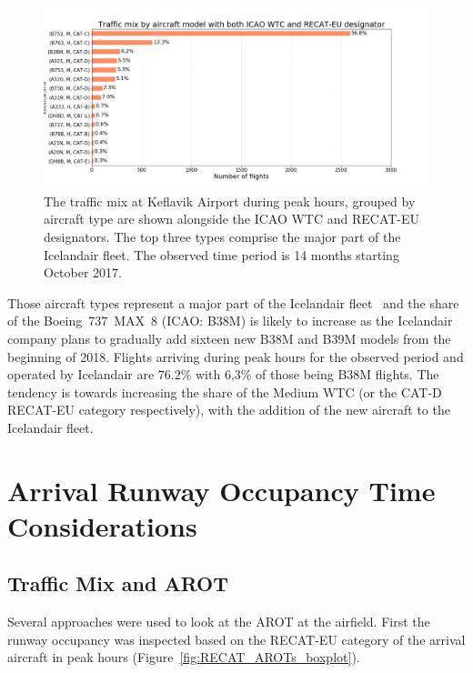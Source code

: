 \begin{figure}[h]
    \centering
    \includegraphics[width=1\textwidth]{graphics/fig_traffic_mix_by_model.png}
    \caption[Traffic mix by aircraft type.]{The traffic mix at Keflavik Airport during peak hours, grouped by aircraft type are shown alongside the ICAO WTC and RECAT-EU designators. The top three types comprise the major part of the Icelandair fleet. The observed time period is 14 months starting October 2017.}
    \label{fig:traffic_mix_by_model}
\end{figure}

 Those aircraft types represent a major part of the Icelandair fleet~\cite{icelandair_fleet} and the share of the Boeing~737~MAX~8 (ICAO: B38M) is likely to increase as the Icelandair company plans to gradually add sixteen new B38M and B39M models from the beginning of 2018. Flights arriving during peak hours for the observed period and operated by Icelandair are 76.2\% with 6,3\% of those being B38M flights. The tendency is towards increasing the share of the Medium WTC (or the CAT-D RECAT-EU category respectively), with the addition of the new aircraft to the Icelandair fleet.


\section{Arrival Runway Occupancy Time Considerations}\label{sec:AROT_considerations} 

\subsection{Traffic Mix and AROT\label{ssec:mix_effect_arot}}

Several approaches were used to look at the AROT at the airfield. First the runway occupancy was inspected based on the RECAT-EU category of the arrival aircraft in peak hours (Figure~\ref{fig:RECAT_AROTs_boxplot}).

